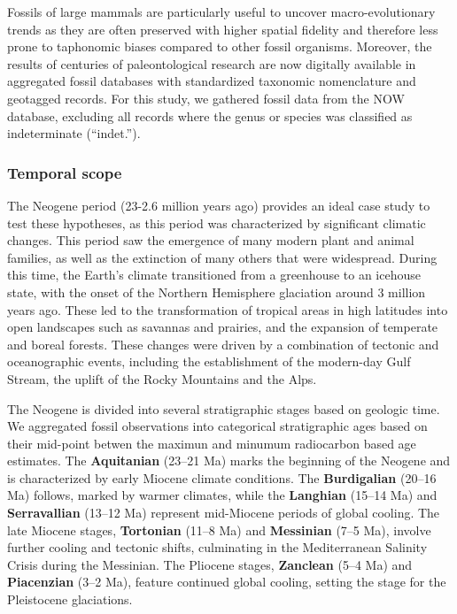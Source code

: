 \documentclass[
]{agujournal2019}
\begin{document}
Fossils of large mammals are particularly useful to uncover
macro-evolutionary trends as they are often preserved with higher
spatial fidelity and therefore less prone to taphonomic biases compared
to other fossil organisms. Moreover, the results of centuries of
paleontological research are now digitally available in aggregated
fossil databases with standardized taxonomic nomenclature and geotagged
records. For this study, we gathered fossil data from the NOW database,
excluding all records where the genus or species was classified as
indeterminate (``indet.'').

\subsubsection{Temporal scope}\label{temporal-scope}

The Neogene period (23-2.6 million years ago) provides an ideal case
study to test these hypotheses, as this period was characterized by
significant climatic changes. This period saw the emergence of many
modern plant and animal families, as well as the extinction of many
others that were widespread. During this time, the Earth's climate
transitioned from a greenhouse to an icehouse state, with the onset of
the Northern Hemisphere glaciation around 3 million years ago. These led
to the transformation of tropical areas in high latitudes into open
landscapes such as savannas and prairies, and the expansion of temperate
and boreal forests. These changes were driven by a combination of
tectonic and oceanographic events, including the establishment of the
modern-day Gulf Stream, the uplift of the Rocky Mountains and the Alps.

The Neogene is divided into several stratigraphic stages based on
geologic time. We aggregated fossil observations into categorical
stratigraphic ages based on their mid-point betwen the maximun and
minumum radiocarbon based age estimates. The \textbf{Aquitanian} (23--21
Ma) marks the beginning of the Neogene and is characterized by early
Miocene climate conditions. The \textbf{Burdigalian} (20--16 Ma)
follows, marked by warmer climates, while the \textbf{Langhian} (15--14
Ma) and \textbf{Serravallian} (13--12 Ma) represent mid-Miocene periods
of global cooling. The late Miocene stages, \textbf{Tortonian} (11--8
Ma) and \textbf{Messinian} (7--5 Ma), involve further cooling and
tectonic shifts, culminating in the Mediterranean Salinity Crisis during
the Messinian. The Pliocene stages, \textbf{Zanclean} (5--4 Ma) and
\textbf{Piacenzian} (3--2 Ma), feature continued global cooling, setting
the stage for the Pleistocene glaciations.
\end{document}
